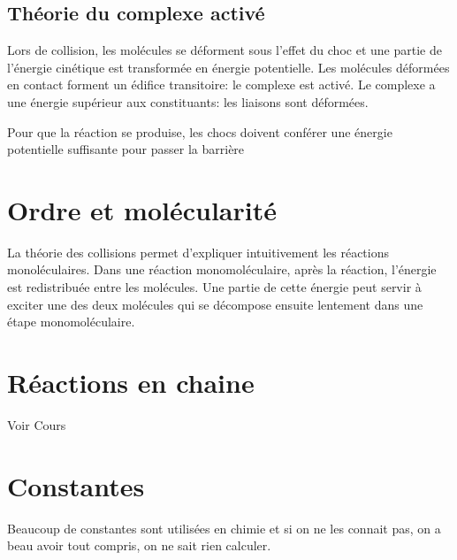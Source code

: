\subsection{Théorie du complexe activé}
Lors de collision, les molécules se déforment sous l'effet du choc et
une partie de l'énergie cinétique est transformée en énergie potentielle.
Les molécules déformées en contact forment un édifice transitoire:
le complexe est activé.
Le complexe a une énergie supérieur aux constituants:
les liaisons sont déformées.

Pour que la réaction se produise,
les chocs doivent conférer une énergie potentielle
suffisante pour passer la barrière

\section{Ordre et molécularité}
La théorie des collisions permet d'expliquer
intuitivement les réactions monoléculaires.
Dans une réaction monomoléculaire, après la réaction,
l'énergie est redistribuée entre les molécules.
Une partie de cette énergie peut servir à exciter une des deux molécules qui
se décompose ensuite lentement dans une étape monomoléculaire.

\section{Réactions en chaine}
Voir Cours

\annexe
\section{Constantes}
Beaucoup de constantes sont utilisées en chimie et si on ne les connait pas,
on a beau avoir tout compris, on ne sait rien calculer.

